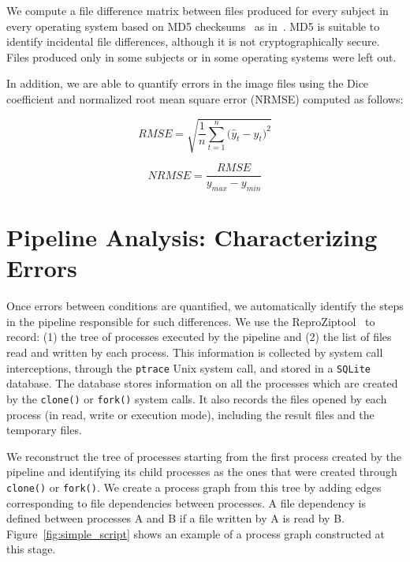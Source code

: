 \documentclass{article}
\newcommand{\reprozip}[0]{ReproZip}
\begin{document}
{We compute a file difference matrix between files produced for every 
subject in every operating system based on MD5 
checksums~\cite{md51992url} as in~\cite{Scaria2017}. MD5 is suitable to 
identify incidental file differences, although it is not 
cryptographically secure. Files produced only in some subjects or in 
some operating systems were left out.

In addition, we are able to quantify errors in the image files using 
the Dice coefficient and normalized root mean square error (NRMSE) 
computed as follows:

\begin{center}
\begin{equation}
RMSE = {\sqrt {\frac{1} {n}{\sum\limits_{t = 1}^n {(\hat{y}_{t} - {y}_{t} } })^{2} } }
\end{equation}
\end{center}

\begin{center}
\begin{equation}
NRMSE = {\frac{RMSE} {y_{max} - y_{min}}}
\end{equation}
\end{center}

\section{Pipeline Analysis: Characterizing Errors}

Once errors between conditions are quantified, we automatically
identify the steps in the pipeline responsible for such differences.
We use the \reprozip tool~\cite{Chirigati2016} to record: (1) the tree of
processes executed by the pipeline and (2) the list of files read and
written by each process. This information is collected by system call
interceptions, through the \texttt{ptrace} Unix system call, and
stored in a \texttt{SQLite} database. The database stores information
on all the processes which are created by the \texttt{clone()} or
\texttt{fork()} system calls. It also records the files opened by each
process (in read, write or execution mode), including the result files
and the temporary files.

We reconstruct the tree of processes starting from the first process 
created by the pipeline and identifying its child processes as the ones 
that were created through \texttt{clone()} or \texttt{fork()}. We 
create a process graph from this tree by adding edges corresponding to 
file dependencies between processes. A file dependency is defined 
between processes A and B if a file written by A is read by B. 
Figure~\ref{fig:simple_script} shows an example of a process graph 
constructed at this stage.

}
\end{document}
